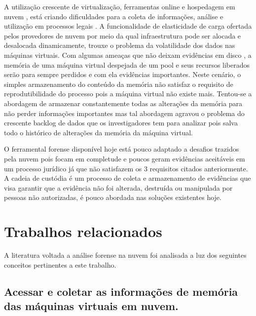 \documentclass[conference]{IEEEtran}
\begin{document}
A utilização crescente de virtualização, ferramentas online e hospedagem em nuvem \cite{Amazon2016}, está criando dificuldades para a coleta de informações, análise e 
utilização em processos legais \cite{Sharma2012}. A funcionalidade de elasticidade de carga ofertada pelos provedores de nuvem por meio da qual infraestrutura pode ser
alocada e desalocada dinamicamente, trouxe o problema da volatilidade dos dados nas máquinas virtuais. Com algumas ameaças que não deixam evidências em disco \cite{Rafique2013},
a memória de uma máquina virtual despejada de um pool e seus recursos liberados serão para sempre perdidos e com ela evidências importantes. Neste cenário, o simples 
armazenamento do conteúdo da memória não satisfaz o requisito de reprodutibilidade do processo pois a máquina virtual não existe mais. Tentou-se a abordagem de armazenar 
constantemente todas as alterações da memória para não perder informações importantes mas tal abordagem agravou o problema do crescente backlog de dados que os investigadores 
tem para analizar \cite{Quick2014} pois salva todo o histórico de alterações da memória da máquina virtual.

O ferramental forense disponível hoje está pouco adaptado a desafios trazidos pela nuvem \cite{Dykstra2012a} pois focam em completude e poucos geram evidências aceitáveis em
um processo jurídico \cite{Reichert2015} já que não satisfazem os 3 requisitos citados anteriormente. A cadeia de custódia é um processo de coleta e armazenamento de evidências
que visa garantir que a evidência não foi alterada, destruída ou manipulada por pessoas não autorizadas, é pouco abordada nas soluções existentes hoje.

\section{Trabalhos relacionados}
\label{sec:related}

A literatura voltada a análise forense na nuvem foi analisada a luz dos seguintes conceitos pertinentes a este trabalho. 

\subsection{Acessar e coletar as informações de memória das máquinas virtuais em nuvem.}
\end{document}
